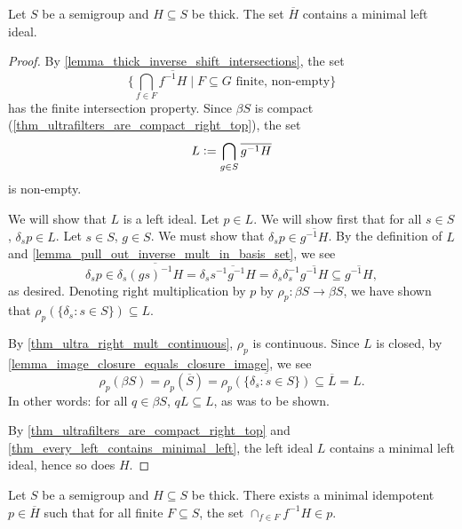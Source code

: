 \begin{lemma}
    \label{lemma_thick_closure_contains_ideal}
    \leanok{}
    Let $S$ be a semigroup and $H \subseteq S$ be thick.  The set $\overline{H}$ contains a minimal left ideal.
\end{lemma}

\begin{proof}
    By \cref{lemma_thick_inverse_shift_intersections}, the set
    \[\big\{ \bigcap_{f \in F} \overline{f^{-1} H} \mid F \subseteq G \text{ finite, non-empty}\big\}\]
    has the finite intersection property.  Since $\beta S$ is compact (\cref{thm_ultrafilters_are_compact_right_top}), the set
    \[L \vcentcolon= \bigcap_{g \in S} \overline{g^{-1}H}\]
    is non-empty.
    
    We will show that $L$ is a left ideal.  Let $p \in L$.  We will show first that for all $s \in S$, $\delta_s p \in L$.  Let $s \in S$, $g \in S$. We must show that $\delta_s p \in \overline{g^{-1} H}$.  By the definition of $L$ and \cref{lemma_pull_out_inverse_mult_in_basis_set}, we see
    \[\delta_sp \in \delta_s \overline{(gs)^{-1} H} = \delta_s \overline{s^{-1}g^{-1} H} = \delta_s \delta_s^{-1} \overline{g^{-1} H} \subseteq \overline{g^{-1} H},\]
    as desired.  Denoting right multiplication by $p$ by $\rho_p: \beta S \to \beta S$, we have shown that $\rho_p(\{\delta_s : s \in S\}) \subseteq L$.

    By \cref{thm_ultra_right_mult_continuous}, $\rho_p$ is continuous.  Since $L$ is closed, by \cref{lemma_image_closure_equals_closure_image}, we see
    \[\rho_p(\beta S) = \rho_p(\overline{S}) = \overline{\rho_p(\{\delta_s : s \in S\})} \subseteq \overline{L} = L.\]
    In other words: for all $q \in \beta S$, $qL \subseteq L$, as was to be shown.
    
    By \cref{thm_ultrafilters_are_compact_right_top} and \cref{thm_every_left_contains_minimal_left}, the left ideal $L$ contains a minimal left ideal, hence so does $H$.
\end{proof}

\begin{lemma}
    \label{lemma_thick_closure_contains_strong_ultrafilter}
    \leanok{}
    Let $S$ be a semigroup and $H \subseteq S$ be thick. There exists a minimal idempotent $p \in \overline{H}$ such that for all finite $F \subseteq S$, the set $\cap_{f \in F} f^{-1} H \in p$.
\end{lemma}

